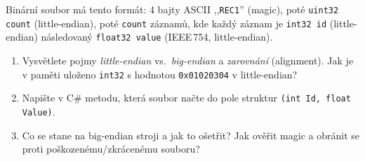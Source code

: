 \begin{zadani}
Binární soubor má tento formát: 4 bajty ASCII ,,\texttt{REC1}'' (magic), poté \texttt{uint32} \texttt{count} (little-endian), poté \texttt{count} záznamů, kde každý záznam je \texttt{int32 id} (little-endian) následovaný \texttt{float32 value} (IEEE\,754, little-endian).
\begin{enumerate}[label=(\alph*)]
  \item {} Vysvětlete pojmy \emph{little-endian} vs.\ \emph{big-endian} a \emph{zarovnání} (alignment). Jak je v paměti uloženo \texttt{int32} s hodnotou \texttt{0x01020304} v little-endian?
  \item {} Napište v C\# metodu, která soubor načte do pole struktur \texttt{(int Id, float Value)}.
  \item {} Co se stane na big-endian stroji a jak to ošetřit? Jak ověřit magic a obránit se proti poškozenému/zkrácenému souboru?
\end{enumerate}
\end{zadani}

